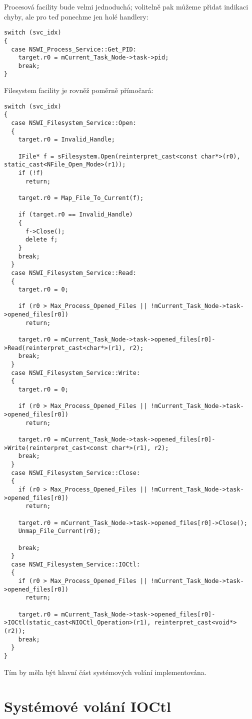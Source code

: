 \documentclass{article}
\begin{document}
Procesová facility bude velmi jednoduchá; volitelně pak můžeme přidat indikaci chyby, ale pro teď ponechme jen holé handlery:
\begin{lstlisting}
switch (svc_idx)
{
  case NSWI_Process_Service::Get_PID:
    target.r0 = mCurrent_Task_Node->task->pid;
    break;
}
\end{lstlisting}
Filesystem facility je rovněž poměrně přímočará:
\begin{lstlisting}
switch (svc_idx)
{
  case NSWI_Filesystem_Service::Open:
  {
    target.r0 = Invalid_Handle;

    IFile* f = sFilesystem.Open(reinterpret_cast<const char*>(r0), static_cast<NFile_Open_Mode>(r1));
    if (!f)
      return;

    target.r0 = Map_File_To_Current(f);

    if (target.r0 == Invalid_Handle)
    {
      f->Close();
      delete f;
    }
    break;
  }
  case NSWI_Filesystem_Service::Read:
  {
    target.r0 = 0;

    if (r0 > Max_Process_Opened_Files || !mCurrent_Task_Node->task->opened_files[r0])
      return;

    target.r0 = mCurrent_Task_Node->task->opened_files[r0]->Read(reinterpret_cast<char*>(r1), r2);
    break;
  }
  case NSWI_Filesystem_Service::Write:
  {
    target.r0 = 0;

    if (r0 > Max_Process_Opened_Files || !mCurrent_Task_Node->task->opened_files[r0])
      return;

    target.r0 = mCurrent_Task_Node->task->opened_files[r0]->Write(reinterpret_cast<const char*>(r1), r2);
    break;
  }
  case NSWI_Filesystem_Service::Close:
  {
    if (r0 > Max_Process_Opened_Files || !mCurrent_Task_Node->task->opened_files[r0])
      return;

    target.r0 = mCurrent_Task_Node->task->opened_files[r0]->Close();
    Unmap_File_Current(r0);

    break;
  }
  case NSWI_Filesystem_Service::IOCtl:
  {
    if (r0 > Max_Process_Opened_Files || !mCurrent_Task_Node->task->opened_files[r0])
      return;

    target.r0 = mCurrent_Task_Node->task->opened_files[r0]->IOCtl(static_cast<NIOCtl_Operation>(r1), reinterpret_cast<void*>(r2));
    break;
  }
}
\end{lstlisting}

Tím by měla být hlavní část systémových volání implementována.

\section{Systémové volání IOCtl}
\end{document}
